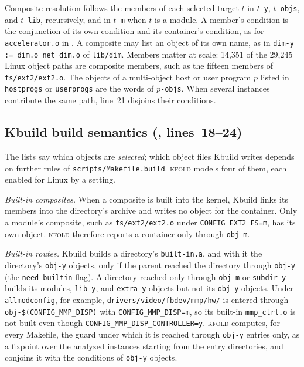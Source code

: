 \documentclass[acmsmall,screen,review]{acmart}
\newcommand{\tool}{\textsc{kfold}\xspace}
\begin{document}
Composite resolution follows the members of each selected target $t$ in \texttt{$t$-y}, \texttt{$t$-objs}, and \texttt{$t$-lib}, recursively, and in \texttt{$t$-m} when $t$ is a module. A member's condition is the conjunction of its own condition and its container's condition, as for \texttt{accelerator.o} in . A composite may list an object of its own name, as in \texttt{dim-y := dim.o net\_dim.o} of \texttt{lib/dim}. Members matter at scale: 14,351 of the 29,245 Linux object paths are composite members, such as the fifteen members of \texttt{fs/ext2/ext2.o}. The objects of a multi-object host or user program $p$ listed in \texttt{hostprogs} or \texttt{userprogs} are the words of \texttt{$p$-objs}. When several instances contribute the same path, line~21 disjoins their conditions.

\subsection{Kbuild build semantics (, lines~18--24)}
\label{sec:design:build}
The lists say which objects are \emph{selected}; which object files Kbuild writes depends on further rules of \texttt{scripts/Makefile.build}. \tool models four of them, each enabled for Linux by a setting.

\emph{Built-in composites.} When a composite is built into the kernel, Kbuild links its members into the directory's archive and writes no object for the container. Only a module's composite, such as \texttt{fs/ext2/ext2.o} under \texttt{CONFIG\_EXT2\_FS=m}, has its own object. \tool therefore reports a container only through \texttt{obj-m}.

\emph{Built-in routes.} Kbuild builds a directory's \texttt{built-in.a}, and with it the directory's \texttt{obj-y} objects, only if the parent reached the directory through \texttt{obj-y} (the \texttt{need-builtin} flag). A directory reached only through \texttt{obj-m} or \texttt{subdir-y} builds its modules, \texttt{lib-y}, and \texttt{extra-y} objects but not its \texttt{obj-y} objects. Under \texttt{allmodconfig}, for example, \texttt{drivers/video/fbdev/mmp/hw/} is entered through \texttt{obj-\$(CONFIG\_MMP\_DISP)} with \texttt{CONFIG\_MMP\_DISP=m}, so its built-in \texttt{mmp\_ctrl.o} is not built even though \texttt{CONFIG\_MMP\_DISP\_CONTROLLER=y}. \tool computes, for every Makefile, the guard under which it is reached through \texttt{obj-y} entries only, as a fixpoint over the analyzed instances starting from the entry directories, and conjoins it with the conditions of \texttt{obj-y} objects.
\end{document}
